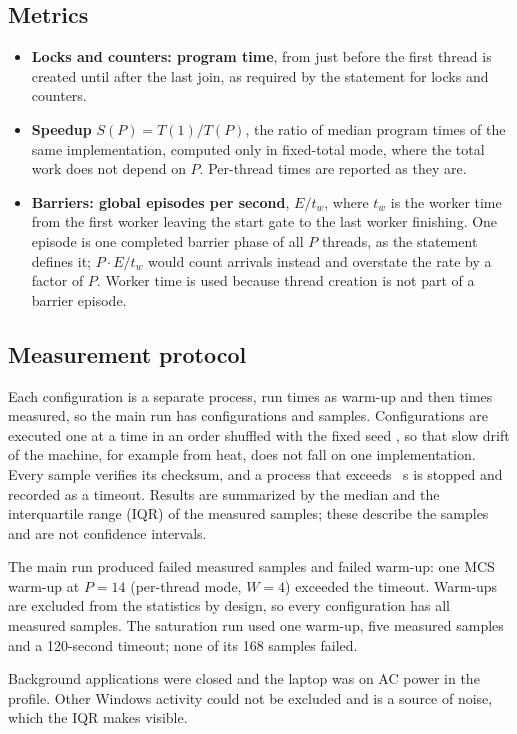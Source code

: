 \subsection{Metrics}\label{sec:metrics}

\begin{itemize}[leftmargin=1.5em]
  \item \textbf{Locks and counters: program time}, from just before the first thread is created until after the last join, as required by the statement for locks and counters.
  \item \textbf{Speedup} $S(P)=T(1)/T(P)$, the ratio of median program times of the same implementation, computed only in fixed-total mode, where the total work does not depend on $P$. Per-thread times are reported as they are.
  \item \textbf{Barriers: global episodes per second}, $E/t_w$, where $t_w$ is the worker time from the first worker leaving the start gate to the last worker finishing. One episode is one completed barrier phase of all $P$ threads, as the statement defines it; $P\cdot E/t_w$ would count arrivals instead and overstate the rate by a factor of $P$. Worker time is used because thread creation is not part of a barrier episode.
\end{itemize}

\subsection{Measurement protocol}\label{sec:protocol}

Each configuration is a separate process, run \Warmups{} times as warm-up and then \Reps{} times measured, so the main run has \NumConfigs{} configurations and \NumSamples{} samples. Configurations are executed one at a time in an order shuffled with the fixed seed \OrderSeed{}, so that slow drift of the machine, for example from heat, does not fall on one implementation. Every sample verifies its checksum, and a process that exceeds \TimeoutS{}~s is stopped and recorded as a timeout. Results are summarized by the median and the interquartile range (IQR) of the measured samples; these describe the samples and are not confidence intervals.

The main run produced \NumFailedMeasured{} failed measured samples and \NumFailedWarmups{} failed warm-up: one MCS warm-up at $P=14$ (per-thread mode, $W=4$) exceeded the timeout. Warm-ups are excluded from the statistics by design, so every configuration has all \Reps{} measured samples. The saturation run used one warm-up, five measured samples and a 120-second timeout; none of its 168 samples failed.

Background applications were closed and the laptop was on AC power in the \PowerScheme{} profile. Other Windows activity could not be excluded and is a source of noise, which the IQR makes visible.

